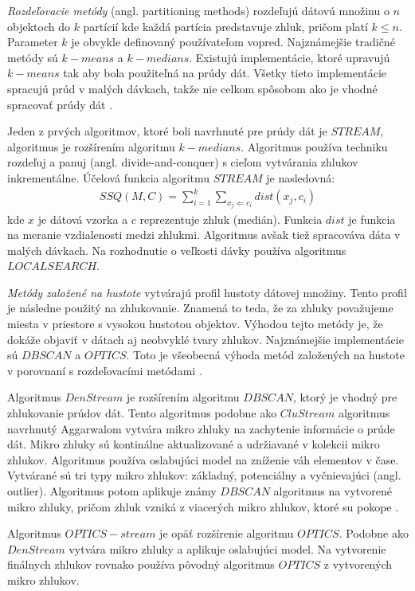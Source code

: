 \textit{Rozdeľovacie metódy} (angl. partitioning methods) rozdeľujú dátovú množinu o $n$ objektoch do $k$ partícií kde každá partícia predstavuje zhluk, pričom platí $k\leq n$. Parameter $k$ je obvykle definovaný používateľom vopred. Najznámejšie tradičné metódy sú $k-means$ a $k-medians$. Existujú implementácie, ktoré upravujú $k-means$ tak aby bola použiteľná na prúdy dát. Všetky tieto implementácie spracujú prúd v malých dávkach, takže nie celkom spôsobom ako je vhodné spracovať prúdy dát \citep{gaber2005mining}.
\par
Jeden z prvých algoritmov, ktoré boli navrhnuté pre prúdy dát je $STREAM$, algoritmus je rozšírením algoritmu $k-medians$. Algoritmus používa techniku rozdeľuj a panuj (angl. divide-and-conquer) s cieľom vytvárania zhlukov inkrementálne. Účelová funkcia algoritmu $STREAM$ je nasledovná:
\begin{align*}
SSQ(M,C) = \sum_{i=1}^{k} \sum_{x_j\Leftarrow c_i} dist(x_j, c_i)
\end{align*}
kde $x$ je dátová vzorka a $c$ reprezentuje zhluk (medián). Funkcia $dist$ je funkcia na meranie vzdialenosti medzi zhlukmi. Algoritmus avšak tiež spracováva dáta v malých dávkach. Na rozhodnutie o veľkosti dávky používa algoritmus $LOCALSEARCH$.

\textit{Metódy založené na hustote} vytvárajú profil hustoty dátovej množiny. Tento profil je následne použitý na zhlukovanie. Znamená to teda, že za zhluky považujeme miesta v priestore s vysokou hustotou objektov. Výhodou tejto metódy je, že dokáže objaviť v dátach aj neobvyklé tvary zhlukov. Najznámejšie implementácie sú $DBSCAN$ a $OPTICS$. Toto je všeobecná výhoda metód založených na hustote v porovnaní s rozdeľovacími metódami \citep{han2011data}.
\par
Algoritmus $DenStream$ je rozšírením algoritmu $DBSCAN$, ktorý je vhodný pre zhlukovanie prúdov dát. Tento algoritmus podobne ako $CluStream$ algoritmus navrhnutý Aggarwalom vytvára mikro zhluky na zachytenie informácie o prúde dát. Mikro zhluky sú kontinálne aktualizované a udržiavané v kolekcii mikro zhlukov. Algoritmus používa oslabujúci model na zníženie váh elementov v čase. Vytvárané sú tri typy mikro zhlukov: základný, potenciálny a vyčnievajúci (angl. outlier). Algoritmus potom aplikuje známy $DBSCAN$ algoritmus na vytvorené mikro zhluky, pričom zhluk vzniká z viacerých mikro zhlukov, ktoré su pokope \citep{nguyen2015survey}.
\par
Algoritmus $OPTICS-stream$ je opäť rozšírenie algoritmu $OPTICS$. Podobne ako $DenStream$ vytvára mikro zhluky a aplikuje oslabujúci model. Na vytvorenie finálnych zhlukov rovnako používa pôvodný algoritmus $OPTICS$ z vytvorených mikro zhlukov.

